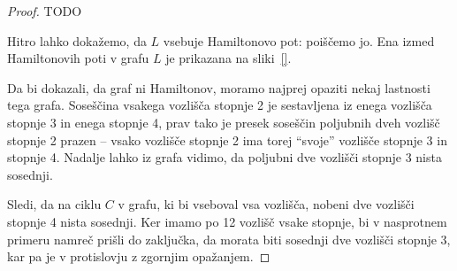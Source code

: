 \documentclass[11pt,a4paper]{article}
\theoremstyle{definition} %
\theoremstyle{plain} %
\begin{document}
\begin{proof}
    TODO
    
    Hitro lahko dokažemo, da $L$ vsebuje Hamiltonovo pot: poiščemo jo. Ena izmed Hamiltonovih poti v grafu $L$ je prikazana na sliki~\ref{}.
    
    Da bi dokazali, da graf ni Hamiltonov, moramo najprej opaziti nekaj lastnosti tega grafa. Soseščina vsakega vozlišča stopnje 2 je sestavljena iz enega vozlišča stopnje 3 in enega stopnje 4, prav tako je presek soseščin poljubnih dveh vozlišč stopnje 2 prazen -- vsako vozlišče stopnje 2 ima torej ``svoje'' vozlišče stopnje 3 in stopnje 4. Nadalje lahko iz grafa vidimo, da poljubni dve vozlišči stopnje 3 nista sosednji.
    
    Sledi, da na ciklu $C$ v grafu, ki bi vseboval vsa vozlišča, nobeni dve vozlišči stopnje 4 nista sosednji. Ker imamo po 12 vozlišč vsake stopnje, bi v nasprotnem primeru namreč prišli do zaključka, da morata biti sosednji dve vozlišči stopnje 3, kar pa je v protislovju z zgornjim opažanjem.
    

\end{proof}
\end{document}
